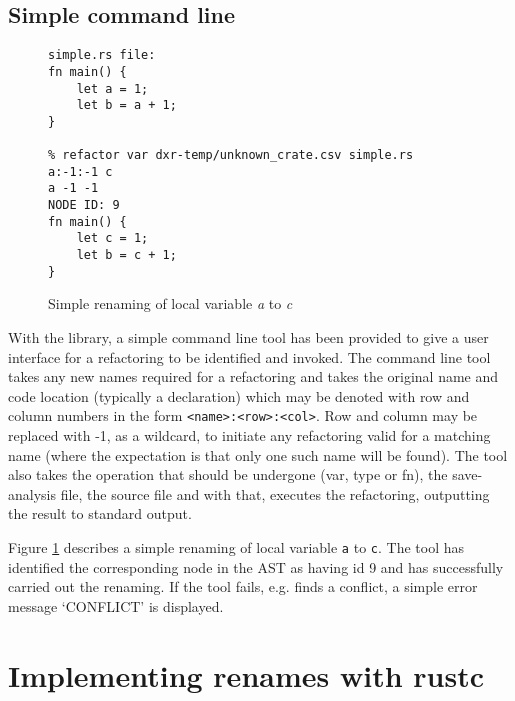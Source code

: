 \subsection{Simple command line}

\begin{figure}[H]
\centering

\begin{verbatim}
simple.rs file:
fn main() {
    let a = 1;
    let b = a + 1;
}

% refactor var dxr-temp/unknown_crate.csv simple.rs  a:-1:-1 c
a -1 -1
NODE ID: 9
fn main() {
    let c = 1;
    let b = c + 1;
}
\end{verbatim}

\caption{Simple renaming of local variable \emph{a} to \emph{c}}
\label{Fig:cmdrename}
\end{figure}


With the library, a simple command line tool has been provided to give a user interface for a refactoring to be identified and invoked. The command line tool takes any new names required for a refactoring and takes the original name and code location (typically a declaration) which may be denoted with row and column numbers in the form {\verb|<name>:<row>:<col>|}. Row and column may be replaced with -1, as a wildcard, to initiate any refactoring valid for a matching name (where the expectation is that only one such name will be found). The tool also takes the operation that should be undergone (var, type or fn), the save-analysis file, the source file and with that, executes the refactoring, outputting the result to standard output.



Figure \ref{Fig:cmdrename} describes a simple renaming of local variable {\verb|a|} to {\verb|c|}. The tool has identified the corresponding node in the AST as having id 9 and has successfully carried out the renaming. If the tool fails, e.g. finds a conflict, a simple error message `CONFLICT' is displayed.


\section{Implementing renames with rustc}\label{S:building}
